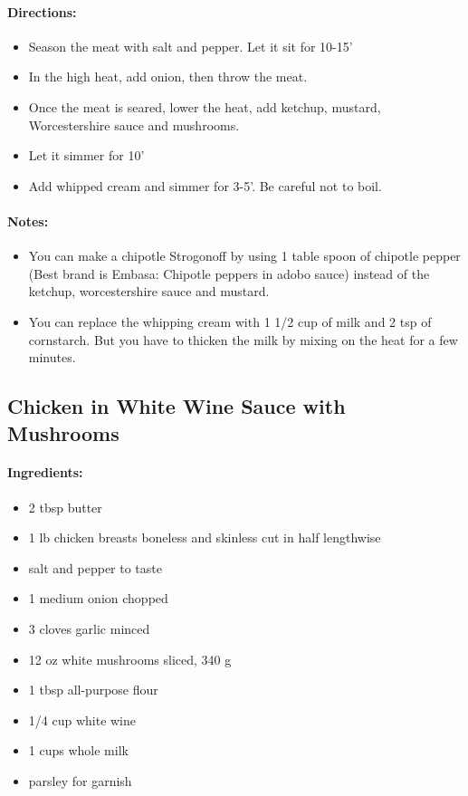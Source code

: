 \documentclass{article}
\begin{document}
\paragraph{Directions:}
\begin{itemize}
	\item Season the meat with salt and pepper. Let it sit for 10-15'
	\item In the high heat, add onion, then throw the meat. 
	\item Once the meat is seared, lower the heat, add ketchup, mustard, Worcestershire sauce and mushrooms.
	\item Let it simmer for 10'
	\item Add whipped cream and simmer for 3-5'. Be careful not to boil.
\end{itemize}

\paragraph{Notes:}
\begin{itemize}
	\item You can make a chipotle Strogonoff by using 1 table spoon of chipotle pepper (Best brand is Embasa: Chipotle peppers in adobo sauce) instead of the ketchup, worcestershire sauce and mustard.
	\item You can replace the whipping cream with 1 1/2 cup of milk and 2 tsp of cornstarch. But you have to thicken the milk by mixing on the heat for a few minutes.
\end{itemize}


\subsection{Chicken in White Wine Sauce with Mushrooms}

\paragraph{Ingredients:}

\begin{itemize}
	\item 2 tbsp butter
	\item 1 lb chicken breasts boneless and skinless cut in half lengthwise
	\item salt and pepper to taste
	\item 1 medium onion chopped
	\item 3 cloves garlic minced
	\item 12 oz white mushrooms sliced, 340 g
	\item 1 tbsp all-purpose flour
	\item 1/4 cup white wine
	\item 1 cups whole milk
	\item parsley for garnish
\end{itemize}
\end{document}

